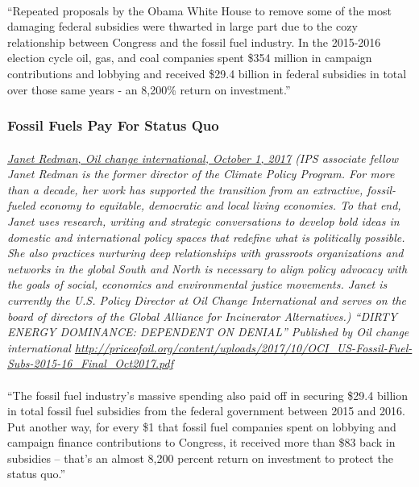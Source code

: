 \documentclass{article}
\begin{document}
\paragraph{}
``Repeated proposals by the Obama White House to remove some of the most damaging federal subsidies were thwarted in large part due to the cozy relationship between Congress and the fossil fuel industry. In the 2015-2016 election cycle oil, gas, and coal companies spent \$354 million in campaign contributions and lobbying and received \$29.4 billion in federal subsidies in total over those same years - an 8,200\% return on investment.”

\subsubsection{Fossil Fuels Pay For Status Quo}
\paragraph{}
\small
\textit{
\underline{Janet Redman, Oil change international, October 1, 2017}
(IPS associate fellow Janet Redman is the former director of the Climate Policy Program. For more than a decade, her work has supported the transition from an extractive, fossil-fueled economy to equitable, democratic and local living economies. To that end, Janet uses research, writing and strategic conversations to develop bold ideas in domestic and international policy spaces that redefine what is politically possible. She also practices nurturing deep relationships with grassroots organizations and networks in the global South and North is necessary to align policy advocacy with the goals of social, economics and environmental justice movements. Janet is currently the U.S. Policy Director at Oil Change International and serves on the board of directors of the Global Alliance for Incinerator Alternatives.) “DIRTY ENERGY DOMINANCE: DEPENDENT ON DENIAL” Published by Oil change international
\url{http://priceofoil.org/content/uploads/2017/10/OCI_US-Fossil-Fuel-Subs-2015-16_Final_Oct2017.pdf }}
\normalsize

\paragraph{}
``The fossil fuel industry’s massive spending also paid off in securing \$29.4 billion in total fossil fuel subsidies from the federal government between 2015 and 2016. Put another way, for every \$1 that fossil fuel companies spent on lobbying and campaign finance contributions to Congress, it received more than \$83 back in subsidies – that’s an almost 8,200 percent return on investment to protect the status quo.”
\end{document}
